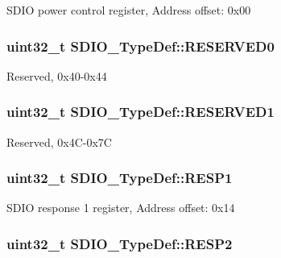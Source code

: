 S\-D\-I\-O power control register, Address offset\-: 0x00 \hypertarget{struct_s_d_i_o___type_def_a0e2d457f1661d986074807447fcef6e5}{
\subsubsection[{R\-E\-S\-E\-R\-V\-E\-D0}]{\setlength{\rightskip}{0pt plus 5cm}uint32\-\_\-t S\-D\-I\-O\-\_\-\-Type\-Def\-::\-R\-E\-S\-E\-R\-V\-E\-D0}}\label{struct_s_d_i_o___type_def_a0e2d457f1661d986074807447fcef6e5}
Reserved, 0x40-\/0x44 \hypertarget{struct_s_d_i_o___type_def_ae2d37baf85fa8126193bf7efc5d63d7a}{
\subsubsection[{R\-E\-S\-E\-R\-V\-E\-D1}]{\setlength{\rightskip}{0pt plus 5cm}uint32\-\_\-t S\-D\-I\-O\-\_\-\-Type\-Def\-::\-R\-E\-S\-E\-R\-V\-E\-D1}}\label{struct_s_d_i_o___type_def_ae2d37baf85fa8126193bf7efc5d63d7a}
Reserved, 0x4\-C-\/0x7\-C \hypertarget{struct_s_d_i_o___type_def_a2b6f1ca5a5a50f8ef5417fe7be22553c}{
\subsubsection[{R\-E\-S\-P1}]{ uint32\-\_\-t S\-D\-I\-O\-\_\-\-Type\-Def\-::\-R\-E\-S\-P1}}\label{struct_s_d_i_o___type_def_a2b6f1ca5a5a50f8ef5417fe7be22553c}
S\-D\-I\-O response 1 register, Address offset\-: 0x14 \hypertarget{struct_s_d_i_o___type_def_a9228c8a38c07c508373644220dd322f0}{
\subsubsection[{R\-E\-S\-P2}]{ uint32\-\_\-t S\-D\-I\-O\-\_\-\-Type\-Def\-::\-R\-E\-S\-P2}}\label{struct_s_d_i_o___type_def_a9228c8a38c07c508373644220dd322f0}
